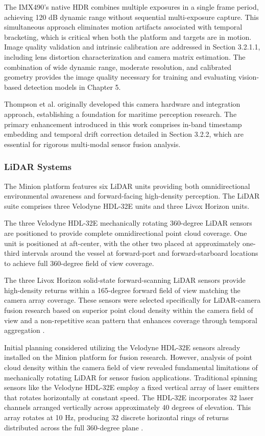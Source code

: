 \documentclass{erauthesis}
\begin{document}
The IMX490's native \ac{HDR} combines multiple exposures in a single frame period, achieving 120 dB dynamic range without sequential multi-exposure capture.
This simultaneous approach eliminates motion artifacts associated with temporal bracketing, which is critical when both the platform and targets are in motion.
Image quality validation and intrinsic calibration are addressed in Section 3.2.1.1, including lens distortion characterization and camera matrix estimation.
The combination of wide dynamic range, moderate resolution, and calibrated geometry provides the image quality necessary for training and evaluating vision-based detection models in Chapter 5.

Thompson et al. \cite{thompson2023} originally developed this camera hardware and integration approach, establishing a foundation for maritime perception research.
The primary enhancement introduced in this work comprises in-band timestamp embedding and temporal drift correction detailed in Section 3.2.2, which are essential for rigorous multi-modal sensor fusion analysis.

            \subsubsection{LiDAR Systems}

The Minion platform features six \ac{LiDAR} units providing both omnidirectional environmental awareness and forward-facing high-density perception.
The \ac{LiDAR} suite comprises three Velodyne HDL-32E units and three Livox Horizon units.

The three Velodyne HDL-32E mechanically rotating 360-degree \ac{LiDAR} sensors are positioned to provide complete omnidirectional point cloud coverage.
One unit is positioned at aft-center, with the other two placed at approximately one-third intervals around the vessel at forward-port and forward-starboard locations to achieve full 360-degree field of view coverage.

The three Livox Horizon solid-state forward-scanning \ac{LiDAR} sensors provide high-density returns within a 165-degree forward field of view matching the camera array coverage.
These sensors were selected specifically for \ac{LiDAR}-camera fusion research based on superior point cloud density within the camera field of view and a non-repetitive scan pattern that enhances coverage through temporal aggregation \cite{thompson2023}.

Initial planning considered utilizing the Velodyne HDL-32E sensors already installed on the Minion platform for fusion research.
However, analysis of point cloud density within the camera field of view revealed fundamental limitations of mechanically rotating \ac{LiDAR} for sensor fusion applications.
Traditional spinning sensors like the Velodyne HDL-32E employ a fixed vertical array of laser emitters that rotates horizontally at constant speed.
The HDL-32E incorporates 32 laser channels arranged vertically across approximately 40 degrees of elevation.
This array rotates at 10 Hz, producing 32 discrete horizontal rings of returns distributed across the full 360-degree plane \cite{thompson2023}.
\end{document}
